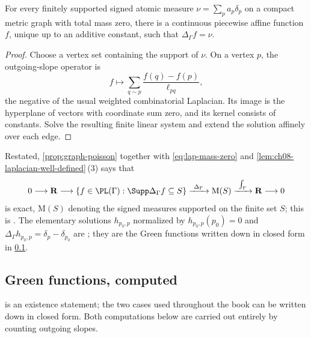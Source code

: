 \begin{proposition}\label{prop:graph-poisson}
For every finitely supported signed atomic measure
$\nu=\sum_pa_p\delta_p$ on a compact metric graph with total mass zero,
there is a continuous piecewise affine function $f$, unique up to an additive
constant, such that $\Delta_\Gamma f=\nu$.
\end{proposition}

\begin{proof}
Choose a vertex set containing the support of $\nu$.  On a vertex $p$, the
outgoing-slope operator is
\[
 f\longmapsto\sum_{q\sim p}\frac{f(q)-f(p)}{\ell_{pq}},
\]
the negative of the usual weighted combinatorial Laplacian.  Its image is
the hyperplane of vectors with coordinate sum zero, and its kernel consists
of constants.  Solve the resulting finite linear system and extend the
solution affinely over each edge.
\end{proof}

Restated, \cref{prop:graph-poisson} together with \eqref{eq:lap-mass-zero}
and \cref{lem:ch08-laplacian-well-defined}\,(3) says that
\[
 0\longrightarrow\mathbf R\longrightarrow
 \{f\in\PL(\Gamma):\Supp\Delta_\Gamma f\subseteq S\}
 \xrightarrow{\ \Delta_\Gamma\ }
 \mathrm M(S)\xrightarrow{\ \int_\Gamma\ }\mathbf R\longrightarrow0
\]
is exact, $\mathrm M(S)$ denoting the signed measures supported on the finite
set $S$; this is \cite[Prop.~1.2.17]{Thu05}.  The elementary solutions
$h_{p_0,p}$ normalized by $h_{p_0,p}(p_0)=0$ and
$\Delta_\Gamma h_{p_0,p}=\delta_p-\delta_{p_0}$ are
\cite[Lem.~1.2.18]{Thu05}; they are the Green functions written down in
closed form in \cref{sec:ch08-green-functions}.

\subsection{Green functions, computed}
\label{sec:ch08-green-functions}

 is an existence statement; the two cases used
throughout the book can be written down in closed form.  Both computations
below are carried out entirely by counting outgoing slopes.

